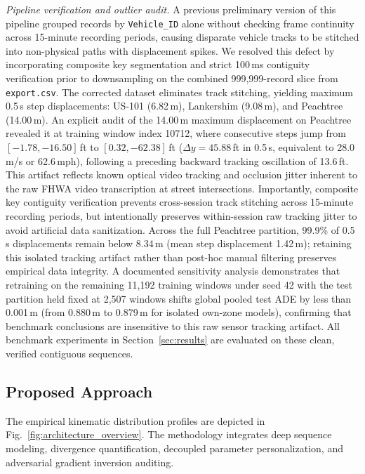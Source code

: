 \documentclass[journal]{IEEEtran}
\begin{document}
\textit{Pipeline verification and outlier audit.} A previous preliminary version of this pipeline grouped records by \texttt{Vehicle\_ID} alone without checking frame continuity across 15-minute recording periods, causing disparate vehicle tracks to be stitched into non-physical paths with displacement spikes. We resolved this defect by incorporating composite key segmentation and strict 100\,ms contiguity verification prior to downsampling on the combined 999,999-record slice from \texttt{export.csv}. The corrected dataset eliminates track stitching, yielding maximum 0.5\,s step displacements: US-101 (6.82\,m), Lankershim (9.08\,m), and Peachtree (14.00\,m). An explicit audit of the 14.00\,m maximum displacement on Peachtree revealed it at training window index 10712, where consecutive steps jump from $[-1.78, -16.50]$\,ft to $[0.32, -62.38]$\,ft ($\Delta y = 45.88$\,ft in 0.5\,s, equivalent to 28.0\,m/s or 62.6\,mph), following a preceding backward tracking oscillation of 13.6\,ft. This artifact reflects known optical video tracking and occlusion jitter inherent to the raw FHWA video transcription at street intersections. Importantly, composite key contiguity verification prevents cross-session track stitching across 15-minute recording periods, but intentionally preserves within-session raw tracking jitter to avoid artificial data sanitization. Across the full Peachtree partition, 99.9\% of 0.5\,s displacements remain below 8.34\,m (mean step displacement 1.42\,m); retaining this isolated tracking artifact rather than post-hoc manual filtering preserves empirical data integrity. A documented sensitivity analysis demonstrates that retraining on the remaining 11,192 training windows under seed 42 with the test partition held fixed at 2,507 windows shifts global pooled test ADE by less than 0.001\,m (from 0.880\,m to 0.879\,m for isolated own-zone models), confirming that benchmark conclusions are insensitive to this raw sensor tracking artifact. All benchmark experiments in Section~\ref{sec:results} are evaluated on these clean, verified contiguous sequences.

\subsection{Proposed Approach}
\label{sec:proposed_approach}
The empirical kinematic distribution profiles are depicted in Fig.~\ref{fig:architecture_overview}. The methodology integrates deep sequence modeling, divergence quantification, decoupled parameter personalization, and adversarial gradient inversion auditing.
\end{document}
